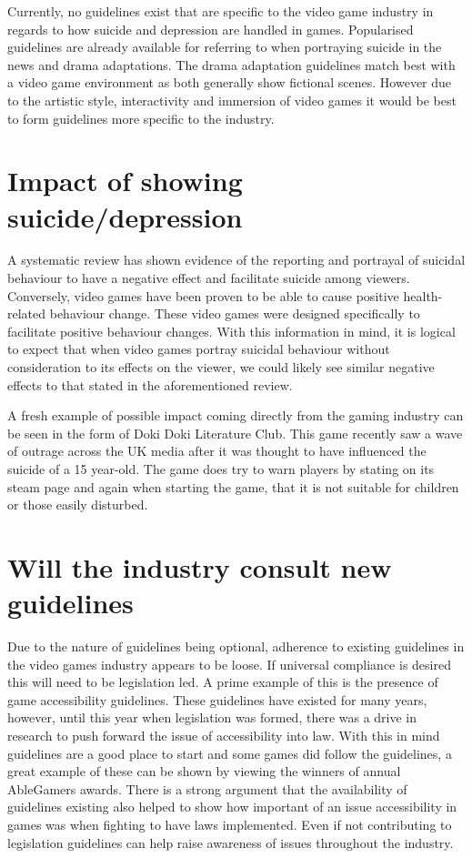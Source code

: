 \documentclass{scrartcl}
\begin{document}
		Currently, no guidelines exist that are specific to the video game industry in regards to how suicide and depression are handled in games. Popularised guidelines are already available for referring to when portraying suicide in the news\cite{world2017preventing,nepon2009media} and drama adaptations\cite{DramaGuidelines}.		
		The drama adaptation guidelines match best with a video game environment as both generally show fictional scenes. However due to the artistic style, interactivity and immersion of video games it would be best to form guidelines more specific to the industry. 	

	\section{Impact of showing suicide/depression}
		A systematic review\cite{pirkis2001suicide} has shown evidence of the reporting and portrayal of suicidal behaviour to have a negative effect and facilitate suicide among viewers. Conversely, video games have been proven to be able to cause positive health-related behaviour change\cite{baranowski2008playing}. These video games were designed specifically to facilitate positive behaviour changes. With this information in mind, it is logical to expect that when video games portray suicidal behaviour without consideration to its effects on the viewer, we could likely see similar negative effects to that stated in the aforementioned review\cite{pirkis2001suicide}.
		
		A fresh example of possible impact coming directly from the gaming industry can be seen in the form of Doki Doki Literature Club\cite{doki}. This game recently saw a wave of outrage across the UK media after it was thought to have influenced the suicide of a 15 year-old\cite{dokiBBC}. The game does try to warn players by stating on its steam page and again when starting the game, that it is not suitable for children or those easily disturbed.

	\section{Will the industry consult new guidelines}
		Due to the nature of guidelines being optional, adherence to existing guidelines in the video games industry appears to be loose. If universal compliance is desired this will need to be legislation led. A prime example of this is the presence of game accessibility guidelines. These guidelines have existed for many years\cite{accessGuidelines1,accessGuidelines2}, however, until this year when legislation was formed, there was a drive in research to push forward the issue of accessibility into law\cite{powers2015video}. With this in mind guidelines are a good place to start and some games did follow the guidelines, a great example of these can be shown by viewing the winners of annual AbleGamers awards\cite{ableGamers}. There is a strong argument that the availability of guidelines existing also helped to show how important of an issue accessibility in games was when fighting to have laws implemented. Even if not contributing to legislation guidelines can help raise awareness of issues throughout the industry.
		
\end{document}
